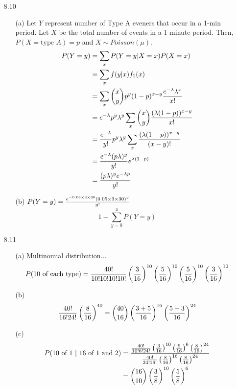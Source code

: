 \documentclass[english, 11pt]{article}
\begin{document}
\begin{itemize}
  \item[8.10]
  \begin{itemize}
    \item[(a)] Let $Y$ represent number of Type A eveners that occur in a 1-min period. Let $X$ be the total number of events in a 1 minute period. Then, $P(X = \mbox{type $A$}) = p$ and $X \sim Poisson(\mu)$.
    \begin{align*}
      P(Y = y) & = \sum_{x} P(Y = y|X=x)P(X=x) \\
               & = \sum_x f(y|x)f_1(x) \\
               & = \sum_x {x \choose y}p^y(1-p)^{x-y} \frac{e^{-\lambda}\lambda^x}{x!} \\
               & = e^{-\lambda}p^y \lambda^y \sum_x {x \choose y}\frac{(\lambda(1-p))^{x-y}}{x!} \\
               & = \frac{e^{-\lambda}}{y!}p^y \lambda^y \sum_x \frac{(\lambda(1-p))^{x-y}}{(x-y)!} \\
               & = \frac{e^{-\lambda}(p\lambda)^y}{y!}e^{\lambda(1-p)} \\
               & = \frac{(p\lambda)^ye^{-\lambda p}}{y!}
    \end{align*}
    \item[(b)] $P(Y = y) = \frac{e^{-0.05\times3\times30}(0.05\times3\times30)^y}{y!}$
    \[ 1 - \sum_{y = 0}^4 P(Y = y) \]

  \end{itemize}
  \item[8.11]
  \begin{itemize}
    \item[(a)] Multinomial distribution...
    \[ P(\mbox{10 of each type}) = \frac{40!}{10!10!10!10!} \left( \frac{3}{16} \right)^{10}\left( \frac{5}{16} \right)^{10}\left( \frac{5}{16} \right)^{10}\left( \frac{3}{16} \right)^{10} \]
    \item[(b)]
    \[ \frac{40!}{16!24!}\left( \frac{8}{16} \right)^{40} =  {40 \choose 16} \left( \frac{3 + 5}{16} \right)^{16} \left( \frac{5 + 3}{16} \right)^{24} \]
    \item[(c)]
    \begin{align*}
      P(\mbox{10 of 1 | 16 of 1 and 2}) & = \frac{\frac{40!}{10!6!24!} \left( \frac{3}{16} \right)^{10} \left( \frac{5}{16} \right)^6 \left( \frac{8}{16} \right)^{24}}{\frac{40!}{24!16!} \left( \frac{8}{16} \right)^{16} \left( \frac{8}{16} \right)^{24} } \\
      & = {16 \choose 10} \left( \frac{3}{8} \right)^{10} \left( \frac{5}{8} \right)^{6}
    \end{align*}
  \end{itemize}


\end{itemize}
\end{document}
